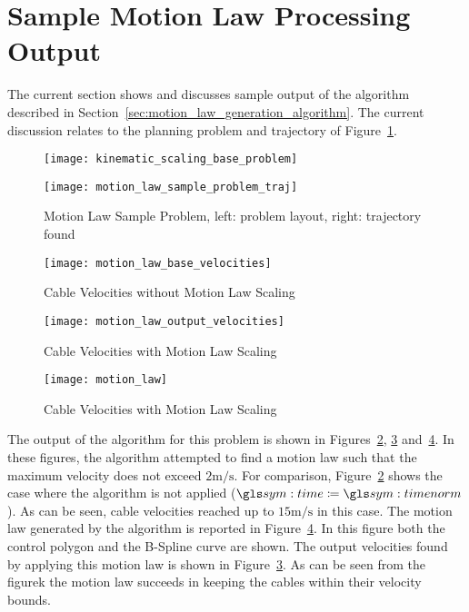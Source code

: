 \section{Sample Motion Law Processing Output}%
\label{sec:sample_motion_law_processing_output}

	The current section shows and discusses sample output of the algorithm
	described in Section~\ref{sec:motion_law_generation_algorithm}. The current
	discussion relates to the planning problem and trajectory of
	Figure~\ref{fig:motion_law_sample_problem}.

	\begin{figure}[hb]
		\begin{minipage}{0.5\textwidth}
			\centering
			\texttt{[image: kinematic\_scaling\_base\_problem]}
		\end{minipage}
		\begin{minipage}{0.5\textwidth}
			\centering
			\texttt{[image: motion\_law\_sample\_problem\_traj]}
		\end{minipage}
		\caption[Motion Law Sample Problem]{Motion Law Sample Problem,
		left: problem layout, right: trajectory found}
		\label{fig:motion_law_sample_problem}
	\end{figure}

	\begin{figure}[hbt!]
		\centering
		\texttt{[image: motion\_law\_base\_velocities]}
		\caption{Cable Velocities without Motion Law Scaling}
		\label{fig:cable_velocities_without_motion_law_scaling}
	\end{figure}

	\begin{figure}[hbt!]
		\centering
		\texttt{[image: motion\_law\_output\_velocities]}
		\caption{Cable Velocities with Motion Law Scaling}
		\label{fig:cable_velocities_with_motion_law_scaling}
	\end{figure}

	\begin{figure}[hbt!]
		\centering
		\texttt{[image: motion\_law]}
		\caption{Cable Velocities with Motion Law Scaling}
		\label{fig:motion_law}
	\end{figure}

	The output of the algorithm for this problem is shown in
	Figures~\ref{fig:cable_velocities_without_motion_law_scaling},
	\ref{fig:cable_velocities_with_motion_law_scaling} and~\ref{fig:motion_law}.
	In these figures, the algorithm attempted to find a motion law such that the
	maximum velocity does not exceed $2\si{\meter\per\second}$. For comparison,
	Figure~\ref{fig:cable_velocities_without_motion_law_scaling} shows the case
	where the algorithm is not applied ($\timesym \defeq \timenorm$). As can be
	seen, cable velocities reached up to $15\si{\meter\per\second}$ in this
	case. The motion law generated by the algorithm is reported in
	Figure~\ref{fig:motion_law}. In this figure both the control polygon and the
	B-Spline curve are shown. The output velocities found by applying this
	motion law is shown in
	Figure~\ref{fig:cable_velocities_with_motion_law_scaling}. As can be seen
	from the figurek the motion law succeeds in keeping the cables within their
	velocity bounds.

